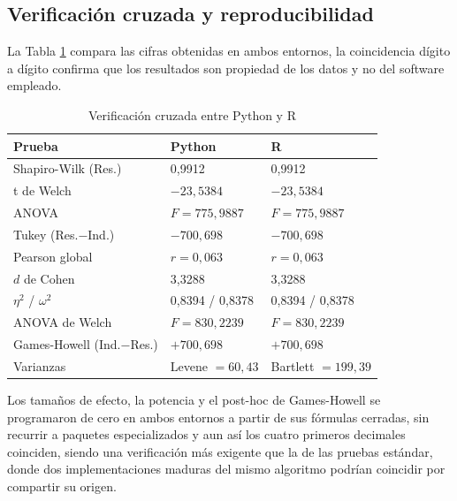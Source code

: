     \subsection{Verificación cruzada y reproducibilidad}
        La Tabla \ref{verificacion} compara las cifras obtenidas en ambos entornos,
        la coincidencia dígito a dígito confirma que los resultados son propiedad de
        los datos y no del software empleado.

        \begin{table}[H]
            \centering
            \caption{Verificación cruzada entre Python y R}
            \begin{center}
                \begin{tabular}{|l|l|l|}
                    \hline
                    \textbf{Prueba} & \textbf{Python} & \textbf{R} \\
                    \hline
                    Shapiro-Wilk (Res.) & 0,9912 & 0,9912 \\
                    \hline
                    t de Welch & $-23{,}5384$ & $-23{,}5384$ \\
                    \hline
                    ANOVA & $F = 775{,}9887$ & $F = 775{,}9887$ \\
                    \hline
                    Tukey (Res.$-$Ind.) & $-700{,}698$ & $-700{,}698$ \\
                    \hline
                    Pearson global & $r = 0{,}063$ & $r = 0{,}063$ \\
                    \hline
                    $d$ de Cohen & 3,3288 & 3,3288 \\
                    \hline
                    $\eta^2$ / $\omega^2$ & 0,8394 / 0,8378 & 0,8394 / 0,8378 \\
                    \hline
                    ANOVA de Welch & $F = 830{,}2239$ & $F = 830{,}2239$ \\
                    \hline
                    Games-Howell (Ind.$-$Res.) & $+700{,}698$ & $+700{,}698$ \\
                    \hline
                    Varianzas & Levene $= 60{,}43$ & Bartlett $= 199{,}39$ \\
                    \hline
                \end{tabular}
                \label{verificacion}
            \end{center}
        \end{table}

        Los tamaños de efecto, la potencia y el post-hoc de Games-Howell se programaron 
        de cero en ambos entornos a partir de sus fórmulas cerradas, sin recurrir a 
        paquetes especializados y aun así los cuatro primeros decimales coinciden, siendo 
        una verificación más exigente que la de las pruebas estándar, donde dos 
        implementaciones maduras del mismo algoritmo podrían coincidir por compartir 
        su origen.

